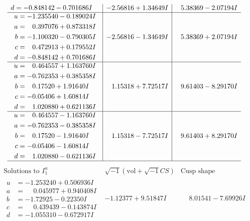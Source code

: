 \documentclass[1p]{elsarticle_modified}
\theoremstyle{definition}
\newcommand{\I}{\sqrt{-1}}
\begin{document}
$$\begin{array}{c|c|c}
\begin{aligned}
d &= -0.848142 - 0.701686 I\end{aligned}
 & -2.56816 + 1.34649 I & \phantom{-}5.38369 - 2.07194 I \\ \hline\begin{aligned}
u &= -1.235540 - 0.189024 I \\
a &= \phantom{-}0.397076 + 0.873318 I \\
b &= -1.100320 - 0.790305 I \\
c &= \phantom{-}0.472913 + 0.179552 I \\
d &= -0.848142 + 0.701686 I\end{aligned}
 & -2.56816 - 1.34649 I & \phantom{-}5.38369 + 2.07194 I \\ \hline\begin{aligned}
u &= \phantom{-}0.464557 + 1.163760 I \\
a &= -0.762353 + 0.385358 I \\
b &= \phantom{-}0.17520 + 1.91640 I \\
c &= -0.05406 + 1.60814 I \\
d &= \phantom{-}1.020880 + 0.621136 I\end{aligned}
 & \phantom{-}1.15318 + 7.72517 I & \phantom{-}9.61403 - 8.29170 I \\ \hline\begin{aligned}
u &= \phantom{-}0.464557 - 1.163760 I \\
a &= -0.762353 - 0.385358 I \\
b &= \phantom{-}0.17520 - 1.91640 I \\
c &= -0.05406 - 1.60814 I \\
d &= \phantom{-}1.020880 - 0.621136 I\end{aligned}
 & \phantom{-}1.15318 - 7.72517 I & \phantom{-}9.61403 + 8.29170 I\\
 \hline 
 \end{array}$$\newpage$$\begin{array}{c|c|c}  
\text{Solutions to }I^u_{1}& \I (\text{vol} + \sqrt{-1}CS) & \text{Cusp shape}\\
 \hline 
\begin{aligned}
u &= -1.253240 + 0.506936 I \\
a &= \phantom{-}0.045977 + 0.940408 I \\
b &= -1.72925 - 0.22350 I \\
c &= \phantom{-}0.439439 - 0.143874 I \\
d &= -1.055310 - 0.672917 I\end{aligned}
 & -1.12377 + 9.51847 I & \phantom{-}8.01541 - 7.69926 I \\ \hline\begin{aligned}

\end{aligned}
\end{array}$$
\end{document}
